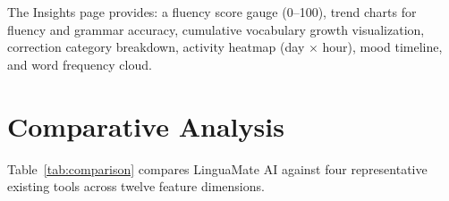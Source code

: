 \documentclass[conference]{IEEEtran}
\begin{document}
The Insights page provides: a fluency score gauge (0--100), trend charts for fluency and grammar accuracy, cumulative vocabulary growth visualization, correction category breakdown, activity heatmap (day $\times$ hour), mood timeline, and word frequency cloud.

\section{Comparative Analysis}

Table~\ref{tab:comparison} compares LinguaMate AI against four representative existing tools across twelve feature dimensions.
\end{document}
